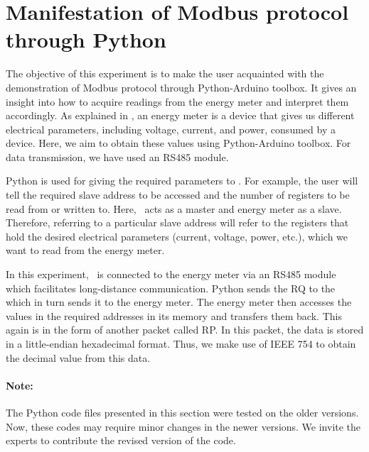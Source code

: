 
\section{Manifestation of Modbus protocol through Python}
The objective of this experiment is to make the user acquainted with
the demonstration of Modbus protocol through Python-Arduino toolbox. 
It gives an insight into how to acquire readings from the energy meter and interpret them accordingly. As explained in , 
an energy meter is a device that gives us different electrical parameters, including voltage, current, and power, consumed by a device. Here, we aim to obtain these values using Python-Arduino toolbox. For data transmission, we have used an RS485 module.

Python is used for giving the required parameters to \arduino. For
example, the user will tell the required slave address to be accessed
and the number of registers to be read from or written to. Here,
\arduino\ acts as a master and energy meter as a slave. Therefore,
referring to a particular slave address will refer to the registers
that hold the desired electrical parameters (current, voltage, power, etc.), which we want to read from the energy meter.

In this experiment, \arduino\ is connected to the energy meter via an RS485 module which facilitates long-distance communication. 
Python sends the RQ to the \arduino\, which in turn sends it to the
energy meter. The energy meter then accesses the values in the
required addresses in its memory and transfers them back. This again
is in the form of another packet called RP. In this packet, the data is stored in a little-endian hexadecimal format. Thus, we make use of IEEE 754 to obtain the decimal value from this data. 

\paragraph{Note: } The Python code files presented in this section were tested on the older versions. Now, these codes may require minor changes in
the newer versions. We invite the experts to contribute the revised version of the code.



